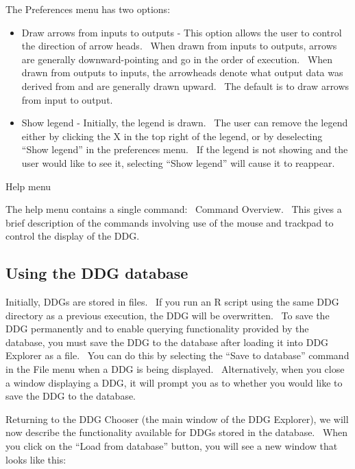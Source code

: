 \documentclass[letterpaper]{article}
\newcommand\liststyleWWviiiNumii{%
\renewcommand\labelitemi{•}
\renewcommand\labelitemii{•}
\renewcommand\labelitemiii{•}
\renewcommand\labelitemiv{•}
}
\begin{document}
{\mdseries\upshape\color{black}
The Preferences menu has two options:}

\liststyleWWviiiNumii
\begin{itemize}
\item {\color{black}
Draw arrows from inputs to outputs - This option allows the user to control the direction of arrow heads. \ When drawn from inputs to outputs, arrows are generally downward-pointing and go in the order of execution. \ When drawn from outputs to inputs, the arrowheads denote what output data was derived from and are generally drawn upward. \ The default is to draw arrows from input to output.}
\item {\color{black}
Show legend - Initially, the legend is drawn. \ The user can remove the legend either by clicking the X in the top right of the legend, or by deselecting “Show legend” in the preferences menu. \ If the legend is not showing and the user would like to see it, selecting “Show legend” will cause it to reappear.}
\end{itemize}
{\color{black}
Help menu}

{\mdseries\upshape\color{black}
The help menu contains a single command: \ Command Overview. \ This gives a brief description of the commands involving use of the mouse and trackpad to control the display of the DDG.}

\subsection[Using the DDG database]{Using the DDG database}
{\mdseries\upshape\color{black}
Initially, DDGs are stored in files. \ If you run an R script using the same DDG directory as a previous execution, the DDG will be overwritten. \ To save the DDG permanently and to enable querying functionality provided by the database, you must save the DDG to the database after loading it into DDG Explorer as a file. \ You can do this by selecting the “Save to database” command in the File menu when a DDG is being displayed. \ Alternatively, when you close a window displaying a DDG, it will prompt you as to whether you would like to save the DDG to the database. \ }

{\mdseries\upshape\color{black}
Returning to the DDG Chooser (the main window of the DDG Explorer), we will now describe the functionality available for DDGs stored in the database. \ When you click on the “Load from database” button, you will see a new window that looks like this:}
\end{document}
